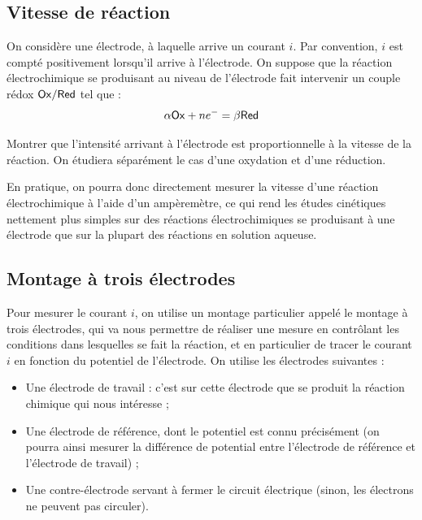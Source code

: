 \documentclass[11pt,fleqn]{book} %
\begin{document}
\subsection{Vitesse de réaction}

On considère une électrode, à laquelle arrive un courant $i$. Par convention, $i$ est compté positivement lorsqu'il arrive à l'électrode. On suppose que la réaction électrochimique se produisant au niveau de l'électrode fait intervenir un couple rédox $\ce{Ox}/\ce{Red}$ tel que :
\begin{equation}
	\alpha \ce{Ox} + n e^- = \beta \ce{Red}
\end{equation}

\begin{capex}
	Montrer que l'intensité arrivant à l'électrode est proportionnelle à la vitesse de la réaction. On étudiera séparément le cas d'une oxydation et d'une réduction.
\end{capex}

En pratique, on pourra donc directement mesurer la vitesse d'une réaction électrochimique à l'aide d'un ampèremètre, ce qui rend les études cinétiques nettement plus simples sur des réactions électrochimiques se produisant à une électrode que sur la plupart des réactions en solution aqueuse.

\subsection{Montage à trois électrodes}

Pour mesurer le courant $i$, on utilise un montage particulier appelé le montage à trois électrodes, qui va nous permettre de réaliser une mesure en contrôlant les conditions dans lesquelles se fait la réaction, et en particulier de tracer le courant $i$ en fonction du potentiel de l'électrode. On utilise les électrodes suivantes :
\begin{itemize}
	\item Une électrode de travail : c'est sur cette électrode que se produit la réaction chimique qui nous intéresse ;
	\item Une électrode de référence, dont le potentiel est connu précisément (on pourra ainsi mesurer la différence de potential entre l'électrode de référence et l'électrode de travail) ;
	\item Une contre-électrode servant à fermer le circuit électrique (sinon, les électrons ne peuvent pas circuler).
\end{itemize}
\end{document}
